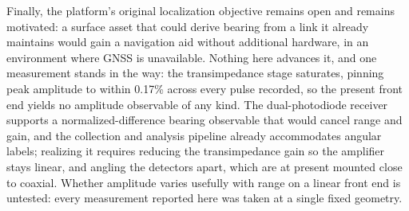 Finally, the platform's original localization objective remains open and remains
motivated: a surface asset that could derive bearing from a link it already
maintains would gain a navigation aid without additional hardware, in an
environment where GNSS is unavailable. Nothing here advances it, and one
measurement stands in the way: the transimpedance stage saturates, pinning peak
amplitude to within 0.17\% across every pulse recorded, so the present front end
yields no amplitude observable of any kind. The dual-photodiode receiver
supports a normalized-difference bearing observable that would cancel range and
gain, and the collection and analysis pipeline already accommodates angular
labels; realizing it requires reducing the transimpedance gain so the amplifier
stays linear, and angling the detectors apart, which are at present mounted
close to coaxial. Whether amplitude varies usefully with range on a linear front
end is untested: every measurement reported here was taken at a single fixed
geometry.
